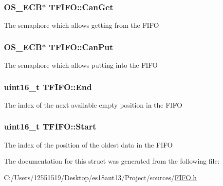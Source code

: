 \subsubsection[{Can\+Get}]{\setlength{\rightskip}{0pt plus 5cm}O\+S\+\_\+\+E\+C\+B$\ast$ T\+F\+I\+F\+O\+::\+Can\+Get}\label{struct_t_f_i_f_o_a1a71a4db58cc625d3160889d91a33125}
The semaphore which allows getting from the F\+I\+F\+O \hypertarget{struct_t_f_i_f_o_a9f4fd72a0313ed8a98e22198171c2fc5}{}
\subsubsection[{Can\+Put}]{\setlength{\rightskip}{0pt plus 5cm}O\+S\+\_\+\+E\+C\+B$\ast$ T\+F\+I\+F\+O\+::\+Can\+Put}\label{struct_t_f_i_f_o_a9f4fd72a0313ed8a98e22198171c2fc5}
The semaphore which allows putting into the F\+I\+F\+O \hypertarget{struct_t_f_i_f_o_a5063b875898a6f23a97aa3ca17f0544b}{}
\subsubsection[{End}]{\setlength{\rightskip}{0pt plus 5cm}uint16\+\_\+t T\+F\+I\+F\+O\+::\+End}\label{struct_t_f_i_f_o_a5063b875898a6f23a97aa3ca17f0544b}
The index of the next available empty position in the F\+I\+F\+O \hypertarget{struct_t_f_i_f_o_a092a7559431a12616672354641908167}{}
\subsubsection[{Start}]{\setlength{\rightskip}{0pt plus 5cm}uint16\+\_\+t T\+F\+I\+F\+O\+::\+Start}\label{struct_t_f_i_f_o_a092a7559431a12616672354641908167}
The index of the position of the oldest data in the F\+I\+F\+O 

The documentation for this struct was generated from the following file\+:\begin{DoxyCompactItemize}
\item 
C\+:/\+Users/12551519/\+Desktop/es18aut13/\+Project/sources/\hyperlink{_f_i_f_o_8h}{F\+I\+F\+O.\+h}\end{DoxyCompactItemize}
